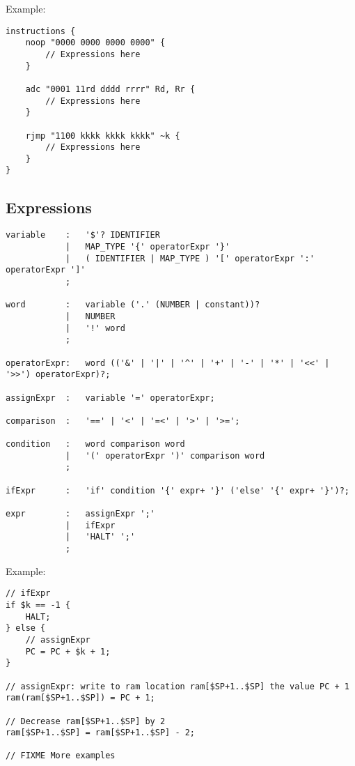 Example:
\begin{lstlisting}
instructions {
	noop "0000 0000 0000 0000" {
		// Expressions here
	}

	adc "0001 11rd dddd rrrr" Rd, Rr {
		// Expressions here
	}

	rjmp "1100 kkkk kkkk kkkk" ~k {
		// Expressions here
	}
}
\end{lstlisting}

\subsection{Expressions}
\begin{lstlisting}
variable	:	'$'? IDENTIFIER
			|	MAP_TYPE '{' operatorExpr '}'
			|	( IDENTIFIER | MAP_TYPE ) '[' operatorExpr ':' operatorExpr ']'
			;

word 		:	variable ('.' (NUMBER | constant))?
			|	NUMBER
			|	'!' word
			;

operatorExpr:	word (('&' | '|' | '^' | '+' | '-' | '*' | '<<' | '>>') operatorExpr)?;

assignExpr	:	variable '=' operatorExpr;

comparison	:	'==' | '<' | '=<' | '>' | '>=';

condition	:	word comparison word
			|	'(' operatorExpr ')' comparison word
			;

ifExpr		:	'if' condition '{' expr+ '}' ('else' '{' expr+ '}')?;

expr		:	assignExpr ';'
			|	ifExpr
			|	'HALT' ';'
			;
\end{lstlisting}

Example:
\begin{lstlisting}
// ifExpr
if $k == -1 {
	HALT;
} else {
	// assignExpr
	PC = PC + $k + 1;
}

// assignExpr: write to ram location ram[$SP+1..$SP] the value PC + 1
ram(ram[$SP+1..$SP]) = PC + 1;

// Decrease ram[$SP+1..$SP] by 2
ram[$SP+1..$SP] = ram[$SP+1..$SP] - 2;

// FIXME More examples
\end{lstlisting}
